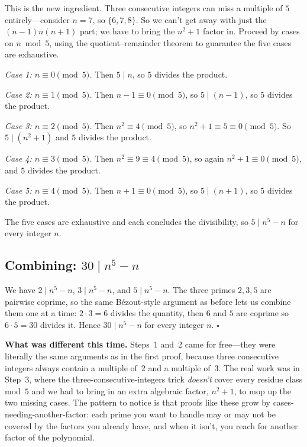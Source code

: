 \documentclass[11pt]{article}
\begin{document}
This is the new ingredient. Three consecutive integers can miss a multiple of $5$ entirely---consider $n = 7$, so $\{6, 7, 8\}$. So we can't get away with just the $(n-1)n(n+1)$ part; we have to bring the $n^2 + 1$ factor in. Proceed by cases on $n \bmod 5$, using the quotient--remainder theorem to guarantee the five cases are exhaustive.

\medskip
\emph{Case 1: $n \equiv 0 \pmod 5$.} Then $5 \mid n$, so $5$ divides the product.

\emph{Case 2: $n \equiv 1 \pmod 5$.} Then $n - 1 \equiv 0 \pmod 5$, so $5 \mid (n-1)$, so $5$ divides the product.

\emph{Case 3: $n \equiv 2 \pmod 5$.} Then $n^2 \equiv 4 \pmod 5$, so $n^2 + 1 \equiv 5 \equiv 0 \pmod 5$. So $5 \mid (n^2 + 1)$ and $5$ divides the product.

\emph{Case 4: $n \equiv 3 \pmod 5$.} Then $n^2 \equiv 9 \equiv 4 \pmod 5$, so again $n^2 + 1 \equiv 0 \pmod 5$, and $5$ divides the product.

\emph{Case 5: $n \equiv 4 \pmod 5$.} Then $n + 1 \equiv 0 \pmod 5$, so $5 \mid (n+1)$, so $5$ divides the product.

The five cases are exhaustive and each concludes the divisibility, so $5 \mid n^5 - n$ for every integer $n$.

\subsection*{Combining: $30 \mid n^5 - n$}

We have $2 \mid n^5 - n$, $3 \mid n^5 - n$, and $5 \mid n^5 - n$. The three primes $2, 3, 5$ are pairwise coprime, so the same B\'ezout-style argument as before lets us combine them one at a time: $2 \cdot 3 = 6$ divides the quantity, then $6$ and $5$ are coprime so $6 \cdot 5 = 30$ divides it. Hence $30 \mid n^5 - n$ for every integer $n$. \hfill$\square$

\medskip
\noindent\textbf{What was different this time.} Steps~1 and~2 came for free---they were literally the same arguments as in the first proof, because three consecutive integers always contain a multiple of~$2$ and a multiple of~$3$. The real work was in Step~3, where the three-consecutive-integers trick \emph{doesn't} cover every residue class mod~$5$ and we had to bring in an extra algebraic factor, $n^2 + 1$, to mop up the two missing cases. The pattern to notice is that proofs like these grow by cases-needing-another-factor: each prime you want to handle may or may not be covered by the factors you already have, and when it isn't, you reach for another factor of the polynomial.
\end{document}
